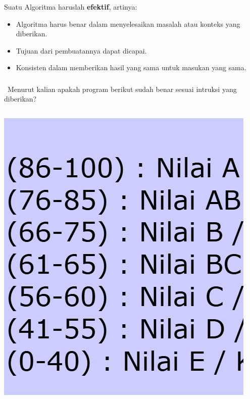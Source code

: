 \documentclass{../praktikum-ppt}
\begin{document}
    \begin{frame}
      \frametitle{\insertsection}
       Suatu Algoritma haruslah \textbf{efektif}, artinya:
       \begin{itemize}
        \item Algoritma harus benar dalam menyelesaikan masalah atau konteks yang diberikan.
        \item Tujuan dari pembuatannya dapat dicapai.
        \item Konsisten dalam memberikan hasil yang sama untuk masukan yang sama.
       \end{itemize}
    \end{frame}

    \begin{frame}[fragile]
      \frametitle{\insertsection}
      \begin{exampleblock}{$\,$}
      Menurut kalian apakah program berikut sudah benar sesuai intruksi yang diberikan?
      \end{exampleblock}
      \begin{columns}
        \begin{column}{0.3\textwidth}
          \includegraphics[width=\textwidth]{Nilai Siakad.png}

\end{column}
\end{columns}
\end{frame}
\end{document}
